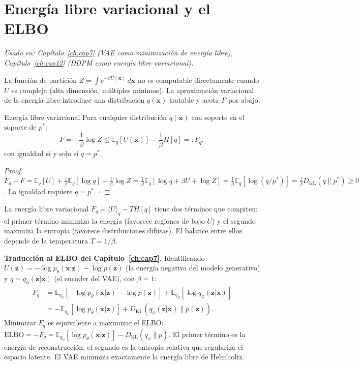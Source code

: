 \section{Energía libre variacional y el ELBO}
\label{sec:ap_elbo_helmholtz}

\textit{Usado en: Capítulo~\ref{ch:cap7} (VAE como minimización de energía libre),
Capítulo~\ref{ch:cap12} (DDPM como energía libre variacional).}

\medskip
La función de partición $Z = \int e^{-\beta U(\bm{x})}\,d\bm{x}$ no es computable
directamente cuando $U$ es compleja (alta dimensión, múltiples mínimos). La
aproximación variacional de la energía libre introduce una distribución
$q(\bm{x})$ tratable y acota $F$ por abajo.

\begin{proposicion}{Energía libre variacional}
\label{prop:ap_flv}
Para cualquier distribución $q(\bm{x})$ con soporte en el soporte de $p^*$:
\begin{equation}
  F = -\frac{1}{\beta}\log Z
  \leq \mathbb{E}_q[U(\bm{x})] - \frac{1}{\beta}H[q]
  =: F_q,
  \label{eq:ap_flv}
\end{equation}
con igualdad si y solo si $q = p^*$.
\end{proposicion}

\begin{proof}
$F_q - F = \mathbb{E}_q[U] + \frac{1}{\beta}\mathbb{E}_q[\log q] + \frac{1}{\beta}
\log Z = \frac{1}{\beta}\mathbb{E}_q[\log q + \beta U + \log Z]
= \frac{1}{\beta}\mathbb{E}_q[\log(q/p^*)] = \frac{1}{\beta}D_{\mathrm{KL}}(q\|p^*)
\geq 0$.
La igualdad requiere $q = p^*$. $\square$
\end{proof}

La energía libre variacional $F_q = \langle U\rangle_q - T H[q]$ tiene dos
términos que compiten: el primer término minimiza la energía (favorece regiones
de bajo $U$) y el segundo maximiza la entropía (favorece distribuciones difusas).
El balance entre ellos depende de la temperatura $T = 1/\beta$.

\medskip\noindent\textbf{Traducción al ELBO del Capítulo~\ref{ch:cap7}.}
Identificando $U(\bm{z}) = -\log p_\theta(\bm{x}|\bm{z}) - \log p(\bm{z})$
(la energía negativa del modelo generativo) y $q = q_\phi(\bm{z}|\bm{x})$
(el encoder del VAE), con $\beta = 1$:
\begin{align*}
  F_q &= \mathbb{E}_{q_\phi}[-\log p_\theta(\bm{x}|\bm{z}) - \log p(\bm{z})]
         + \mathbb{E}_{q_\phi}[\log q_\phi(\bm{z}|\bm{x})] \\
      &= -\mathbb{E}_{q_\phi}[\log p_\theta(\bm{x}|\bm{z})]
         + D_{\mathrm{KL}}(q_\phi(\bm{z}|\bm{x})\|p(\bm{z})).
\end{align*}
Minimizar $F_q$ es equivalente a maximizar el ELBO:
$\mathrm{ELBO} = -F_q = \mathbb{E}_{q_\phi}[\log p_\theta(\bm{x}|\bm{z})]
- D_{\mathrm{KL}}(q_\phi\|p)$.
El primer término es la energía de reconstrucción; el segundo es la entropía
relativa que regulariza el espacio latente. El VAE minimiza exactamente la
energía libre de Helmholtz.


